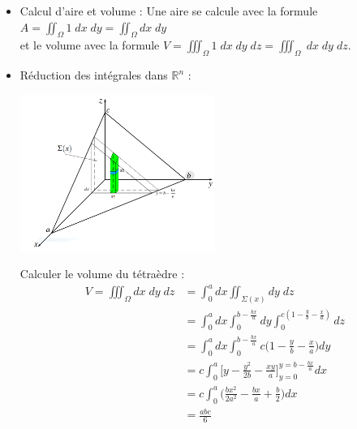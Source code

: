 \documentclass[a4paper]{article}
\begin{document}
\begin{itemize}





\item Calcul d'aire et volume : Une aire se calcule avec la formule $\displaystyle A = \iint_\Omega 1 \; d x \; d y = \iint_\Omega d x \; d y $ \\ et le volume avec la formule $\displaystyle V = \iiint_\Omega 1 \; d x \; d y \; d z = \iiint_\Omega \; d x \; d y \; d z $.






\item Réduction des intégrales dans $ \mathbb{R}^n $ : 

\begin{center}
\includegraphics[width=0.5\textwidth]{tetraedre.PNG}
\end{center}

Calculer le volume du tétraèdre : 
\begin{align*}
V = \iiint_\Omega d x \; d y \; d z &= \int_0^a d x \iint_{\Sigma (x)} d y \; d z \\
 &= \int_0^a d x \int_0^{b - \frac{b x}{a}} d y \int_0^{c (1 - \frac{y}{b} - \frac{x}{a})} d z \\
 &= \int_0^a d x \int_0^{b - \frac{b x}{a}} c \bigg( 1 - \frac{y}{b} - \frac{x}{a} \bigg) d y \\
 &= c \int_0^a \bigg[ y - \frac{y^2}{2 b} - \frac{x y}{a} \bigg]_{y=0}^{y=b-\frac{b x}{a}} d x \\
 &= c \int_0^a \bigg( \frac{b x^2}{2 a^2} - \frac{b x}{a} + \frac{b}{2} \bigg) d x \\
 &= \frac{a b c}{6}
\end{align*}






\end{itemize}
\end{document}
